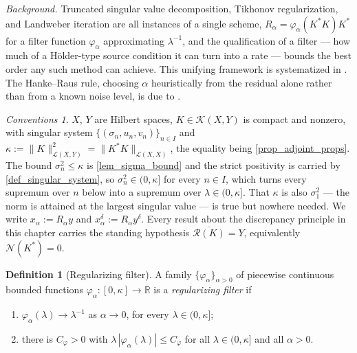 \documentclass[a4paper]{report}
\theoremstyle{plain}
\theoremstyle{definition}
\newtheorem{definition}[theorem]{Definition}
\theoremstyle{remark}
\newtheorem{assumptions}[theorem]{Conventions}
\newcommand{\Ll}{\mathcal{L}}
\newcommand{\Kk}{\mathcal{K}}
\newcommand{\Ran}{\mathcal{R}}
\newcommand{\Ker}{\mathcal{N}}
\begin{document}
\noindent\emph{Background.} Truncated singular value decomposition, Tikhonov
regularization, and Landweber iteration are all instances of a single scheme,
$R_{\alpha} = \varphi_{\alpha}(K^{*}K)K^{*}$ for a filter function $\varphi_{\alpha}$
approximating $\lambda^{-1}$, and the qualification of a filter --- how much of a
Hölder-type source condition it can turn into a rate --- bounds the best order any such
method can achieve. This unifying framework is systematized in
\citet{EnglHankeNeubauer1996}. The Hanke--Raus rule, choosing $\alpha$ heuristically from
the residual alone rather than from a known noise level, is due to \citet{HankeRaus1996}.

\begin{assumptions}
  \label{asm_spectral_regularization}
  $X$, $Y$ are Hilbert spaces, $K \in \Kk(X,Y)$ is
compact and nonzero, with singular system $\{(\sigma_n, u_n, v_n)\}_{n \in I}$ and
$\kappa := \|K\|^{2}_{\Ll(X,Y)} = \|K^{*}K\|_{\Ll(X,X)}$, the equality being
\cref{prop_adjoint_props}.  The bound $\sigma_n^{2} \le \kappa$ is \cref{lem_sigma_bound}
and the strict positivity is carried by \cref{def_singular_system}, so
$\sigma_n^{2} \in (0,\kappa]$ for every $n \in I$, which turns every supremum over $n$
below into a supremum over $\lambda \in (0,\kappa]$.  That $\kappa$ is also $\sigma_1^{2}$
--- the norm is attained at the largest singular value --- is true but nowhere needed.  We
write
$x_{\alpha} := R_{\alpha} y$ and $x^{\delta}_{\alpha} := R_{\alpha} y^{\delta}$.  Every
result about the discrepancy principle in this chapter carries the standing hypothesis
$\overline{\Ran(K)} = Y$, equivalently $\Ker(K^{*}) = 0$.
\end{assumptions}

\begin{definition}[Regularizing filter]
  \label{def_filter}
  A family $\{\varphi_{\alpha}\}_{\alpha>0}$ of piecewise continuous bounded functions
  $\varphi_{\alpha} \colon [0,\kappa] \to \mathbb{R}$ is a \emph{regularizing filter} if
  \begin{enumerate}
    \item $\varphi_{\alpha}(\lambda) \to \lambda^{-1}$ as $\alpha \to 0$, for every
      $\lambda \in (0,\kappa]$;
    \item there is $C_{\varphi} > 0$ with $\lambda\,|\varphi_{\alpha}(\lambda)| \le
      C_{\varphi}$ for all $\lambda \in (0,\kappa]$ and all $\alpha > 0$.
  \end{enumerate}
\end{definition}
\end{document}
